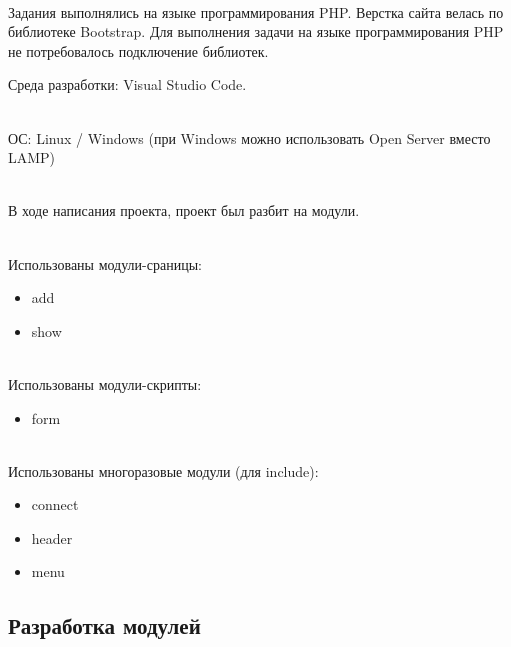 \hspace{0pt}\\

Задания выполнялись на языке программирования PHP. Верстка сайта велась по библиотеке Bootstrap. Для выполнения задачи на языке программирования PHP не потребовалось подключение библиотек. 

\hspace{0pt}

Среда разработки: Visual Studio Code.

\hspace{0pt}\\

ОС: Linux / Windows (при Windows можно использовать Open Server вместо LAMP)

\hspace{0pt}\\

В ходе написания проекта, проект был разбит на модули.

\hspace{0pt}\\

Использованы модули-сраницы: 

\begin{itemize}
    \item add
    \item show
\end{itemize}

\hspace{0pt}\\

Использованы модули-скрипты: 

\begin{itemize}
    \item form
\end{itemize}

\hspace{0pt}\\

Использованы многоразовые модули (для include): 

\begin{itemize}
    \item connect
    \item header
    \item menu
\end{itemize}

\newpage

\subsection{Разработка модулей}

